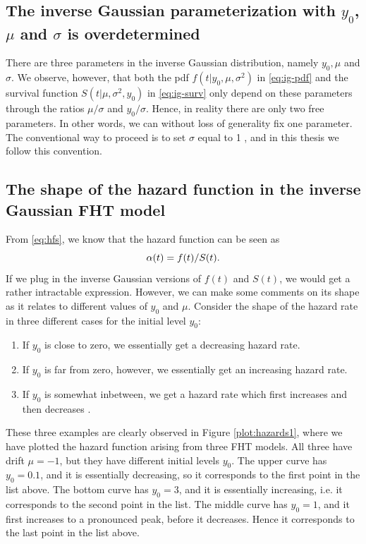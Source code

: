 \subsection{The inverse Gaussian parameterization with $y_0$, $\mu$ and $\sigma$ is overdetermined}
\label{subsec:overdetermined}
There are three parameters in the inverse Gaussian distribution, namely $y_0, \mu$ and $\sigma$.
We observe, however, that both the pdf $f(t|y_0,\mu,\sigma^2)$ in \eqref{eq:ig-pdf} and the survival function $S(t|\mu,\sigma^2,y_0)$ in \eqref{eq:ig-surv} only depend on these parameters through the ratios $\mu/\sigma$ and $y_0/\sigma$.
Hence, in reality there are only two free parameters.
In other words, we can without loss of generality fix one parameter.
The conventional way to proceed is to set $\sigma$ equal to 1 \citep{leewhitmore2006}, and in this thesis we follow this convention.

\subsection{The shape of the hazard function in the inverse Gaussian FHT model}
From \eqref{eq:hfs}, we know that the hazard function can be seen as
\begin{equation*}
    \alpha(t)=f(t)/S(t).
\end{equation*}
If we plug in the inverse Gaussian versions of $f(t)$ and $S(t)$, we would get a rather intractable expression.
However, we can make some comments on its shape as it relates to different values of $y_0$ and $\mu$.
Consider the shape of the hazard rate in three different cases for the initial level $y_0$:
\begin{enumerate}
    \item
        If $y_0$ is close to zero, we essentially get a decreasing hazard rate.
    \item
        If $y_0$ is far from zero, however, we essentially get an increasing hazard rate.
    \item
        If $y_0$ is somewhat inbetween, we get a hazard rate which first increases and then decreases \citep{ABG}.
\end{enumerate}
These three examples are clearly observed in Figure \ref{plot:hazards1}, where we have plotted the hazard function arising from three FHT models.
All three have drift $\mu=-1$, but they have different initial levels $y_0$.
The upper curve has $y_0=0.1$, and it is essentially decreasing, so it corresponds to the first point in the list above.
The bottom curve has $y_0=3$, and it is essentially increasing, i.e. it corresponds to the second point in the list.
The middle curve has $y_0=1$, and it first increases to a pronounced peak, before it decreases.
Hence it corresponds to the last point in the list above.

